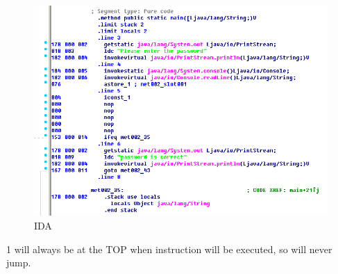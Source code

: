 \begin{figure}[H]
\centering
\includegraphics[scale=\FigScale]{Java_and_NET/java/13_patching/2/3.png}
\caption{IDA}
\end{figure}

1 will always be at the \ac{TOP} when  instruction will be executed, 
so  will never jump.
